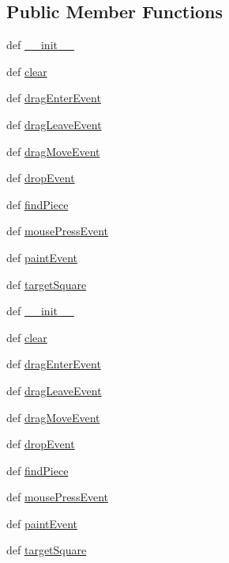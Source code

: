 \subsection*{Public Member Functions}
\begin{DoxyCompactItemize}
\item 
def \hyperlink{classpuzzle_1_1PuzzleWidget_adf1454d3e19636ad06cee91e7a80448f}{\+\_\+\+\_\+init\+\_\+\+\_\+}
\item 
def \hyperlink{classpuzzle_1_1PuzzleWidget_ac2bd84ab3366864f42fa9a39a1c190f6}{clear}
\item 
def \hyperlink{classpuzzle_1_1PuzzleWidget_ae3793834cfaaedda24f677e77aa3cb17}{drag\+Enter\+Event}
\item 
def \hyperlink{classpuzzle_1_1PuzzleWidget_a80c7caec136b0dc72a7d343a5903070d}{drag\+Leave\+Event}
\item 
def \hyperlink{classpuzzle_1_1PuzzleWidget_a8e4ae5a96a005f7f5a41fd855656185c}{drag\+Move\+Event}
\item 
def \hyperlink{classpuzzle_1_1PuzzleWidget_a5e7e22bd4f8eb6500e3ed3edef7b2e85}{drop\+Event}
\item 
def \hyperlink{classpuzzle_1_1PuzzleWidget_a4edf43864e8b43ce9976061fddf5199e}{find\+Piece}
\item 
def \hyperlink{classpuzzle_1_1PuzzleWidget_a0bdfbd8983a167a27b36db8ae91869ef}{mouse\+Press\+Event}
\item 
def \hyperlink{classpuzzle_1_1PuzzleWidget_ac24e7f00b3ecabf20b1ba5d62d1b090f}{paint\+Event}
\item 
def \hyperlink{classpuzzle_1_1PuzzleWidget_a2a7af70d419ec1ee6ebd5233c3b319f2}{target\+Square}
\item 
def \hyperlink{classpuzzle_1_1PuzzleWidget_adf1454d3e19636ad06cee91e7a80448f}{\+\_\+\+\_\+init\+\_\+\+\_\+}
\item 
def \hyperlink{classpuzzle_1_1PuzzleWidget_ac2bd84ab3366864f42fa9a39a1c190f6}{clear}
\item 
def \hyperlink{classpuzzle_1_1PuzzleWidget_ae3793834cfaaedda24f677e77aa3cb17}{drag\+Enter\+Event}
\item 
def \hyperlink{classpuzzle_1_1PuzzleWidget_a80c7caec136b0dc72a7d343a5903070d}{drag\+Leave\+Event}
\item 
def \hyperlink{classpuzzle_1_1PuzzleWidget_a8e4ae5a96a005f7f5a41fd855656185c}{drag\+Move\+Event}
\item 
def \hyperlink{classpuzzle_1_1PuzzleWidget_a5e7e22bd4f8eb6500e3ed3edef7b2e85}{drop\+Event}
\item 
def \hyperlink{classpuzzle_1_1PuzzleWidget_a4edf43864e8b43ce9976061fddf5199e}{find\+Piece}
\item 
def \hyperlink{classpuzzle_1_1PuzzleWidget_a0bdfbd8983a167a27b36db8ae91869ef}{mouse\+Press\+Event}
\item 
def \hyperlink{classpuzzle_1_1PuzzleWidget_ac24e7f00b3ecabf20b1ba5d62d1b090f}{paint\+Event}
\item 
def \hyperlink{classpuzzle_1_1PuzzleWidget_a2a7af70d419ec1ee6ebd5233c3b319f2}{target\+Square}
\end{DoxyCompactItemize}

